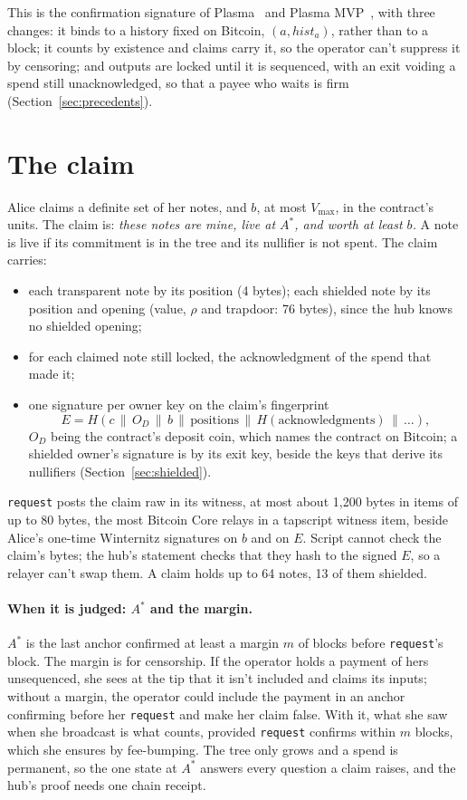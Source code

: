 \documentclass[11pt]{article}
\newcommand{\vmax}{V_{\max}}
\newcommand{\Astar}{A^{*}}
\newcommand{\tx}[1]{\texttt{#1}}
\begin{document}
This is the confirmation signature of Plasma~\cite{plasma} and Plasma
MVP~\cite{plasmamvp}, with three changes: it binds to a history fixed on
Bitcoin, $(a, \mathit{hist}_a)$, rather than to a block; it counts by
existence and claims carry it, so the operator can't suppress it by
censoring; and outputs are locked until it is sequenced, with an exit
voiding a spend still unacknowledged, so that a payee who waits is firm
(Section~\ref{sec:precedents}).

\section{The claim}
\label{sec:claim}

Alice claims a definite set of her notes, and $b$, at most $\vmax$, in
the contract's units. The claim is: \emph{these notes are mine, live at
$\Astar$, and worth at least $b$.} A note is live if its commitment is
in the tree and its nullifier is not spent. The claim carries:
\begin{itemize}[leftmargin=1.5em]
\item each transparent note by its position (4 bytes); each shielded
  note by its position and opening (value, $\rho$ and trapdoor: 76
  bytes), since the hub knows no shielded opening;
\item for each claimed note still locked, the acknowledgment of the
  spend that made it;
\item one signature per owner key on the claim's fingerprint
  \[
    E = H(c \,\|\, O_D \,\|\, b \,\|\, \text{positions} \,\|\, H(\text{acknowledgments}) \,\|\, \ldots),
  \]
  $O_D$ being the contract's deposit coin, which names the contract on
  Bitcoin; a shielded owner's signature is by its exit key, beside the
  keys that derive its nullifiers (Section~\ref{sec:shielded}).
\end{itemize}
\tx{request} posts the claim raw in its witness, at most about 1,200
bytes in items of up to 80 bytes, the most Bitcoin Core relays in a
tapscript witness item, beside Alice's one-time Winternitz signatures on
$b$ and on $E$. Script cannot check the claim's bytes; the hub's
statement checks that they hash to the signed $E$, so a relayer can't
swap them. A claim holds up to 64 notes, 13 of them shielded.

\paragraph{When it is judged: $\Astar$ and the margin.} $\Astar$ is the
last anchor confirmed at least a margin $m$ of blocks before
\tx{request}'s block. The margin is for censorship. If the operator holds
a payment of hers unsequenced, she sees at the tip that it isn't
included and claims its inputs; without a margin, the operator could
include the payment in an anchor confirming before her \tx{request} and
make her claim false. With it, what she saw when she broadcast is what
counts, provided \tx{request} confirms within $m$ blocks, which she
ensures by fee-bumping. The tree only grows and a spend is permanent, so
the one state at $\Astar$ answers every question a claim raises, and the
hub's proof needs one chain receipt.
\end{document}

